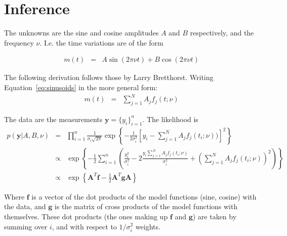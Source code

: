\documentclass[a4paper, 10pt]{article}
\title{}
\author{Me}
\date{\today}
\begin{document}
\maketitle


\section{Inference}
The unknowns are the sine and cosine amplitudes $A$ and $B$ respectively,
and the frequency $\nu$. I.e. the time variations are of the form

\begin{eqnarray}
m(t) &=& A\sin(2\pi\nu t) + B\cos(2\pi\nu t)\label{eq:sinusoids}
\end{eqnarray}

The following derivation follows those by Larry Bretthorst. Writing
Equation~\ref{eq:sinusoids} in the more general form:
\begin{eqnarray}
m(t) &=& \sum_{j=1}^N A_j f_j(t; \nu)\label{eq:sinusoids}
\end{eqnarray}

The data are the measurements
$\mathbf{y} = \{y_i\}_{i=1}^n$.
The likelihood is
\begin{eqnarray}
p(\mathbf{y} | A, B, \nu)
&=&
\prod_{i=1}^{n} \frac{1}{\sigma_i \sqrt{2\pi}}
\exp\left\{
-\frac{1}{2\sigma_i^2}
\left[y_i - \sum_{j=1}^N A_j f_j(t_i; \nu))\right]^2
\right\}
\\
&\propto&
\exp\left\{
-\frac{1}{2}\sum_{i=1}^n
\left(
\frac{y_i^2}{\sigma_i^2} - 2\frac{y_i \sum_{j=1}^N A_j f_j(t_i; \nu)}{\sigma_i^2}
+ \left(\sum_{j=1}^N A_j f_j(t_i; \nu)\right)^2
\right)
\right\}\nonumber\\
&\propto&
\exp\left\{
\mathbf{A}^T\mathbf{f}
 -\frac{1}{2} \mathbf{A}^T\mathbf{g}\mathbf{A}
\right\}
\end{eqnarray}

Where $\mathbf{f}$ is a vector of the dot products of the model functions
(sine, cosine) with the data, and $\mathbf{g}$ is the matrix of cross products
of the model functions with themselves. These dot products
(the ones making up $\mathbf{f}$ and $\mathbf{g}$) are taken
by summing over $i$, and with respect to $1/\sigma_i^2$ weights.
\end{document}
